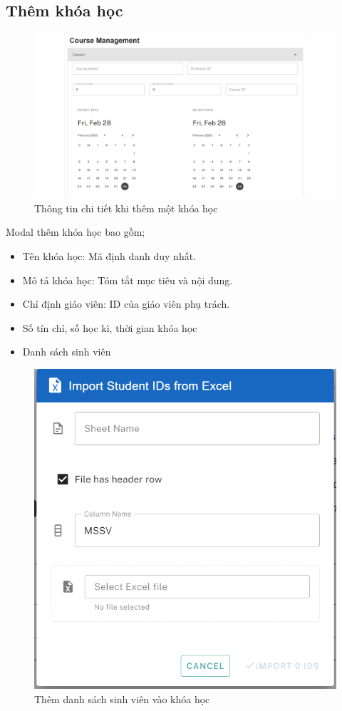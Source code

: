 \subsection{Thêm khóa học}
\begin{figure}[H]
    \centering
    \includegraphics[width=0.8\linewidth]{images/admin_add_detail_course.png}
    \caption{Thông tin chi tiết khi thêm một khóa học}
    \label{fig:enter-label}
\end{figure}
Modal thêm khóa học bao gồm;
\begin{itemize}
    \item Tên khóa học: Mã định danh duy nhất.
    \item Mô tả khóa học: Tóm tắt mục tiêu và nội dung.
    \item Chỉ định giáo viên: ID của giáo viên phụ trách.
    \item Số tín chỉ, số học kì, thời gian khóa học
    \item Danh sách sinh viên
\end{itemize}
\begin{figure}[H]
    \centering
    \includegraphics[width=0.6\linewidth]{images/admin_import_student_in_course.png}
    \caption{Thêm danh sách sinh viên vào khóa học}
    \label{fig:enter-label}
\end{figure}
